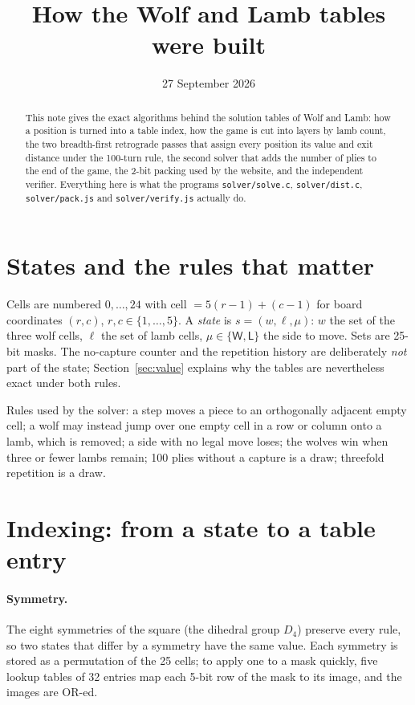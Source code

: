 \documentclass[11pt,a4paper]{article}
\title{How the Wolf and Lamb tables were built}
\author{}
\date{27 September 2026}
\newcommand{\W}{\mathsf{W}}
\newcommand{\Lb}{\mathsf{L}}
\begin{document}
\maketitle

\begin{abstract}
This note gives the exact algorithms behind the solution tables of Wolf and Lamb:
how a position is turned into a table index, how the game is cut into layers by
lamb count, the two breadth-first retrograde passes that assign every position its
value and exit distance under the 100-turn rule, the second solver that adds the
number of plies to the end of the game, the 2-bit packing used by the website,
and the independent verifier. Everything here is what the programs
\texttt{solver/solve.c}, \texttt{solver/dist.c}, \texttt{solver/pack.js} and
\texttt{solver/verify.js} actually do.
\end{abstract}

\section{States and the rules that matter}

Cells are numbered $0,\dots,24$ with cell $=5(r-1)+(c-1)$ for board coordinates
$(r,c)$, $r,c\in\{1,\dots,5\}$. A \emph{state} is $s=(w,\ell,\mu)$: $w$ the set
of the three wolf cells, $\ell$ the set of lamb cells, $\mu\in\{\W,\Lb\}$ the side
to move. Sets are 25-bit masks. The no-capture counter and the repetition history
are deliberately \emph{not} part of the state; Section~\ref{sec:value} explains
why the tables are nevertheless exact under both rules.

Rules used by the solver: a step moves a piece to an orthogonally adjacent empty
cell; a wolf may instead jump over one empty cell in a row or column onto a lamb,
which is removed; a side with no legal move loses; the wolves win when three or
fewer lambs remain; 100 plies without a capture is a draw; threefold repetition is
a draw.

\section{Indexing: from a state to a table entry}\label{sec:index}

\paragraph{Symmetry.} The eight symmetries of the square (the dihedral group
$D_4$) preserve every rule, so two states that differ by a symmetry have the same
value. Each symmetry is stored as a permutation of the 25 cells; to apply one to a
mask quickly, five lookup tables of 32 entries map each 5-bit row of the mask to
its image, and the images are OR-ed.
\end{document}
